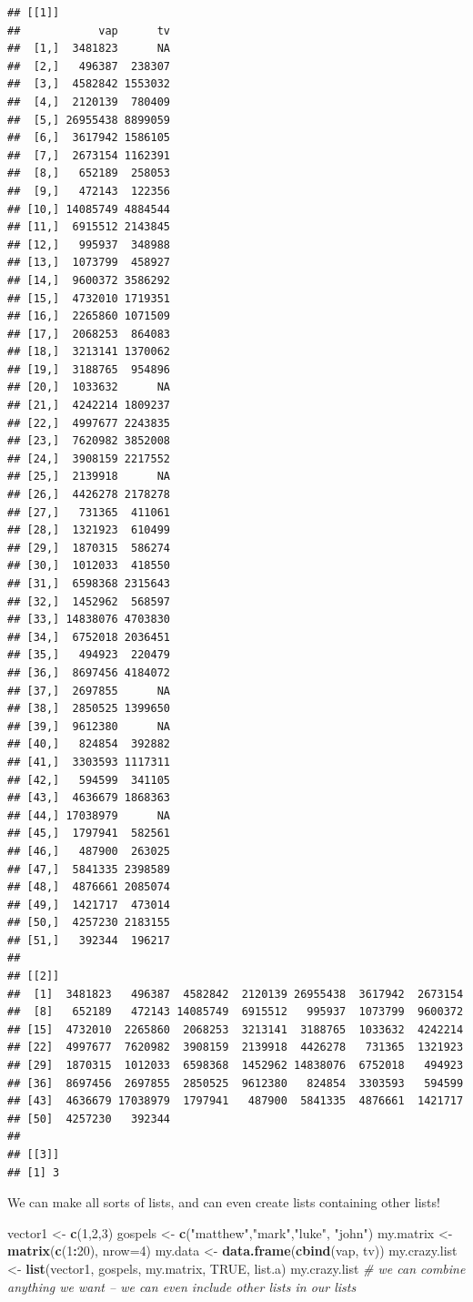 \documentclass[]{article}
\newenvironment{Shaded}{\begin{snugshade}}{\end{snugshade}}
\newcommand{\KeywordTok}[1]{\textcolor[rgb]{0.13,0.29,0.53}{\textbf{#1}}}
\newcommand{\DataTypeTok}[1]{\textcolor[rgb]{0.13,0.29,0.53}{#1}}
\newcommand{\DecValTok}[1]{\textcolor[rgb]{0.00,0.00,0.81}{#1}}
\newcommand{\StringTok}[1]{\textcolor[rgb]{0.31,0.60,0.02}{#1}}
\newcommand{\CommentTok}[1]{\textcolor[rgb]{0.56,0.35,0.01}{\textit{#1}}}
\newcommand{\OtherTok}[1]{\textcolor[rgb]{0.56,0.35,0.01}{#1}}
\newcommand{\OperatorTok}[1]{\textcolor[rgb]{0.81,0.36,0.00}{\textbf{#1}}}
\newcommand{\NormalTok}[1]{#1}
\begin{document}
\begin{verbatim}
## [[1]]
##            vap      tv
##  [1,]  3481823      NA
##  [2,]   496387  238307
##  [3,]  4582842 1553032
##  [4,]  2120139  780409
##  [5,] 26955438 8899059
##  [6,]  3617942 1586105
##  [7,]  2673154 1162391
##  [8,]   652189  258053
##  [9,]   472143  122356
## [10,] 14085749 4884544
## [11,]  6915512 2143845
## [12,]   995937  348988
## [13,]  1073799  458927
## [14,]  9600372 3586292
## [15,]  4732010 1719351
## [16,]  2265860 1071509
## [17,]  2068253  864083
## [18,]  3213141 1370062
## [19,]  3188765  954896
## [20,]  1033632      NA
## [21,]  4242214 1809237
## [22,]  4997677 2243835
## [23,]  7620982 3852008
## [24,]  3908159 2217552
## [25,]  2139918      NA
## [26,]  4426278 2178278
## [27,]   731365  411061
## [28,]  1321923  610499
## [29,]  1870315  586274
## [30,]  1012033  418550
## [31,]  6598368 2315643
## [32,]  1452962  568597
## [33,] 14838076 4703830
## [34,]  6752018 2036451
## [35,]   494923  220479
## [36,]  8697456 4184072
## [37,]  2697855      NA
## [38,]  2850525 1399650
## [39,]  9612380      NA
## [40,]   824854  392882
## [41,]  3303593 1117311
## [42,]   594599  341105
## [43,]  4636679 1868363
## [44,] 17038979      NA
## [45,]  1797941  582561
## [46,]   487900  263025
## [47,]  5841335 2398589
## [48,]  4876661 2085074
## [49,]  1421717  473014
## [50,]  4257230 2183155
## [51,]   392344  196217
## 
## [[2]]
##  [1]  3481823   496387  4582842  2120139 26955438  3617942  2673154
##  [8]   652189   472143 14085749  6915512   995937  1073799  9600372
## [15]  4732010  2265860  2068253  3213141  3188765  1033632  4242214
## [22]  4997677  7620982  3908159  2139918  4426278   731365  1321923
## [29]  1870315  1012033  6598368  1452962 14838076  6752018   494923
## [36]  8697456  2697855  2850525  9612380   824854  3303593   594599
## [43]  4636679 17038979  1797941   487900  5841335  4876661  1421717
## [50]  4257230   392344
## 
## [[3]]
## [1] 3
\end{verbatim}

We can make all sorts of lists, and can even create lists containing
other lists!

\begin{Shaded}
\begin{Highlighting}[]
\NormalTok{vector1 <-}\StringTok{ }\KeywordTok{c}\NormalTok{(}\DecValTok{1}\NormalTok{,}\DecValTok{2}\NormalTok{,}\DecValTok{3}\NormalTok{)}
\NormalTok{gospels <-}\StringTok{ }\KeywordTok{c}\NormalTok{(}\StringTok{"matthew"}\NormalTok{,}\StringTok{"mark"}\NormalTok{,}\StringTok{"luke"}\NormalTok{, }\StringTok{"john"}\NormalTok{)}
\NormalTok{my.matrix <-}\StringTok{ }\KeywordTok{matrix}\NormalTok{(}\KeywordTok{c}\NormalTok{(}\DecValTok{1}\OperatorTok{:}\DecValTok{20}\NormalTok{), }\DataTypeTok{nrow=}\DecValTok{4}\NormalTok{)}
\NormalTok{my.data <-}\StringTok{ }\KeywordTok{data.frame}\NormalTok{(}\KeywordTok{cbind}\NormalTok{(vap, tv))}
\NormalTok{my.crazy.list <-}\StringTok{ }\KeywordTok{list}\NormalTok{(vector1, gospels, my.matrix, }\OtherTok{TRUE}\NormalTok{, list.a)}
\NormalTok{my.crazy.list }\CommentTok{# we can combine anything we want -- we can even include other lists in our lists}
\end{Highlighting}
\end{Shaded}
\end{document}
